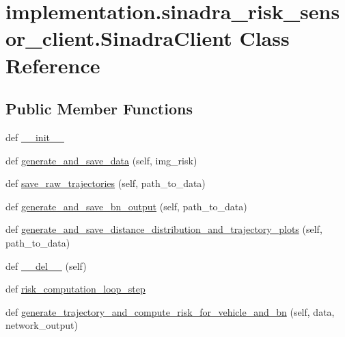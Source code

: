 \hypertarget{classimplementation_1_1sinadra__risk__sensor__client_1_1_sinadra_client}{}\section{implementation.\+sinadra\+\_\+risk\+\_\+sensor\+\_\+client.\+Sinadra\+Client Class Reference}
\label{classimplementation_1_1sinadra__risk__sensor__client_1_1_sinadra_client}
\subsection*{Public Member Functions}
\begin{DoxyCompactItemize}
\item 
def \hyperlink{classimplementation_1_1sinadra__risk__sensor__client_1_1_sinadra_client_a84329d20e8b5e7455783f51edd03bcf5}{\+\_\+\+\_\+init\+\_\+\+\_\+}
\item 
def \hyperlink{classimplementation_1_1sinadra__risk__sensor__client_1_1_sinadra_client_ac10cb9eb1969653d2da9fb16ff8afacf}{generate\+\_\+and\+\_\+save\+\_\+data} (self, img\+\_\+risk)
\item 
def \hyperlink{classimplementation_1_1sinadra__risk__sensor__client_1_1_sinadra_client_a72dc644b563e8b5c9511f6f152947fb4}{save\+\_\+raw\+\_\+trajectories} (self, path\+\_\+to\+\_\+data)
\item 
def \hyperlink{classimplementation_1_1sinadra__risk__sensor__client_1_1_sinadra_client_a9042de0eaf88c0fe147a8da991dc9a40}{generate\+\_\+and\+\_\+save\+\_\+bn\+\_\+output} (self, path\+\_\+to\+\_\+data)
\item 
def \hyperlink{classimplementation_1_1sinadra__risk__sensor__client_1_1_sinadra_client_ae6ad18ad914f568a4180ed7d1506720b}{generate\+\_\+and\+\_\+save\+\_\+distance\+\_\+distribution\+\_\+and\+\_\+trajectory\+\_\+plots} (self, path\+\_\+to\+\_\+data)
\item 
def \hyperlink{classimplementation_1_1sinadra__risk__sensor__client_1_1_sinadra_client_abe9d274f0e0aa4d91c9e8246bf22de29}{\+\_\+\+\_\+del\+\_\+\+\_\+} (self)
\item 
def \hyperlink{classimplementation_1_1sinadra__risk__sensor__client_1_1_sinadra_client_ad26e89ca6152ef6cc3b0226344ce1d2d}{risk\+\_\+computation\+\_\+loop\+\_\+step}
\item 
def \hyperlink{classimplementation_1_1sinadra__risk__sensor__client_1_1_sinadra_client_a58a6cfb24a4a625451a28eedd07a4c47}{generate\+\_\+trajectory\+\_\+and\+\_\+compute\+\_\+risk\+\_\+for\+\_\+vehicle\+\_\+and\+\_\+bn} (self, data, network\+\_\+output)

\end{DoxyCompactItemize}
